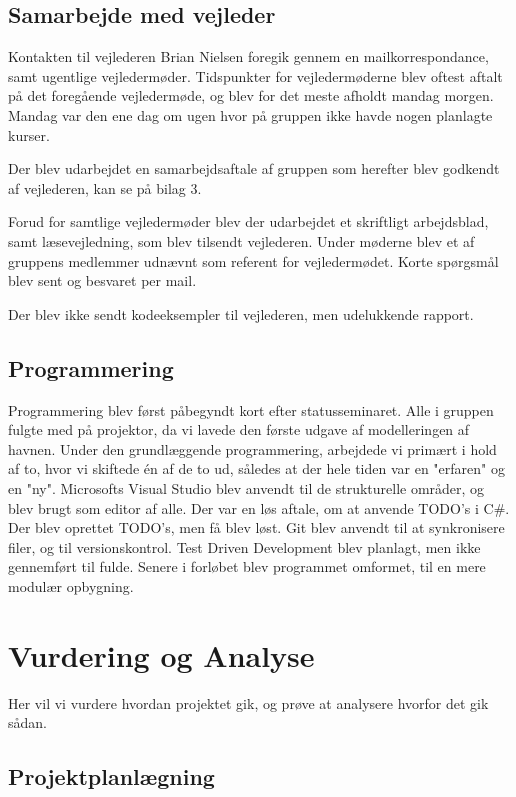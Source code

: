 \documentclass[a4paper,12pt,oneside]{article}
\begin{document}
\subsection{Samarbejde med vejleder}
Kontakten til vejlederen Brian Nielsen foregik gennem en mailkorrespondance, samt ugentlige vejledermøder. Tidspunkter for vejledermøderne blev oftest aftalt på det foregående vejledermøde, og blev for det meste afholdt mandag morgen. Mandag var den ene dag om ugen hvor på gruppen ikke havde nogen planlagte kurser. 

Der blev udarbejdet en samarbejdsaftale af gruppen som herefter blev godkendt af vejlederen, kan se på bilag 3. 

Forud for samtlige vejledermøder blev der udarbejdet et skriftligt arbejdsblad, samt læsevejledning, som blev tilsendt vejlederen. Under møderne blev et af gruppens medlemmer udnævnt som referent for vejledermødet. Korte spørgsmål blev sent og besvaret per mail.

Der blev ikke sendt kodeeksempler til vejlederen, men udelukkende rapport.

\subsection{Programmering}

Programmering blev først påbegyndt kort efter statusseminaret. Alle i gruppen fulgte med på projektor, da vi lavede den første udgave af modelleringen af havnen. Under den grundlæggende programmering, arbejdede vi primært i hold af to, hvor vi skiftede én af de to ud, således at der hele tiden var en "erfaren" og en "ny". Microsofts Visual Studio blev anvendt til de strukturelle områder, og blev brugt som editor af alle. Der var en løs aftale, om at anvende TODO's i C\#. Der blev oprettet TODO's, men få blev løst. Git blev anvendt til at synkronisere filer, og til versionskontrol. Test Driven Development blev planlagt, men ikke gennemført til fulde. Senere i forløbet blev programmet omformet, til en mere modulær opbygning.

\section{Vurdering og Analyse}

Her vil vi vurdere hvordan projektet gik, og prøve at analysere hvorfor det gik sådan. 

\subsection{Projektplanlægning}
\end{document}
